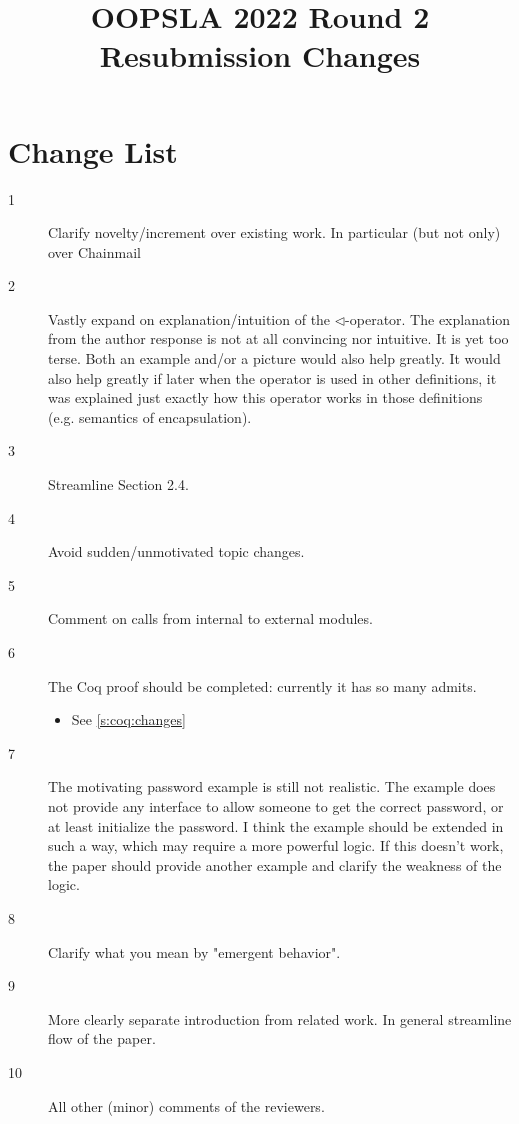 \documentclass[11pt]{amsart}
\title{OOPSLA 2022 Round 2 Resubmission Changes}
\begin{document}
\maketitle

 \section{Change List}
 
 \begin{description}
 
 \item[1]
 Clarify novelty/increment over existing work. In particular (but not only) over Chainmail 
 
 \item[2]
 Vastly expand on explanation/intuition of the 
 $\triangleleft$-operator. The explanation from the author response is not at all 
 convincing nor intuitive. It is yet too terse. Both an example and/or a picture 
 would also help greatly. It would also help greatly if later when the operator is 
 used in other definitions, it was explained just exactly how this operator works 
 in those definitions (e.g. semantics of encapsulation).
 
 \item[3]
 Streamline Section 2.4.
 
 \item[4]
 Avoid sudden/unmotivated topic changes.
 
 \item[5]
 Comment on calls from internal to external modules.
 
 \item[6]
 The Coq proof should be completed: currently it has so many admits.
 \begin{itemize}
 \item See \ref{s:coq:changes}
 \end{itemize}
 
 \item[7]
 The motivating password example is still not realistic. The example does not provide any interface to allow someone to get the correct password, or at least initialize the password. I think the example should be extended in such a way, which may require a more powerful logic. If this doesn't work, the paper should provide another example and clarify the weakness of the logic.
 
 \item[8]
 Clarify what you mean by "emergent behavior".
 
 \item[9]
 More clearly separate introduction from related work. In general streamline flow of the paper.
 
 \item[10]
 All other (minor) comments of the reviewers.
 
 \end{description}
 
\end{document}
